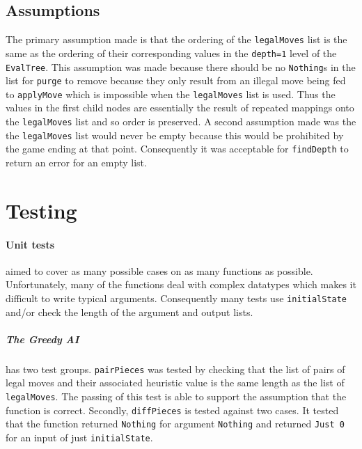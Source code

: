 \documentclass[11pt]{article}
\begin{document}
 \subsection{Assumptions}%
The primary assumption made is that the ordering of the \verb|legalMoves| list is the same as the ordering of their corresponding values in the \verb|depth=1| level of the \verb|EvalTree|. This assumption was made because there should be no \verb|Nothing|s in the list for \verb|purge| to remove because they only result from an illegal move being fed to \verb|applyMove| which is impossible when the \verb|legalMoves| list is used. Thus the values in the first child nodes are essentially the result of repeated mappings onto the \verb|legalMoves| list and so order is preserved. A second assumption made was the the \verb|legalMoves| list would never be empty because this would be prohibited by the game ending at that point. Consequently it was acceptable for \verb|findDepth| to return an error for an empty list.

\newpage
\section{Testing}%
\paragraph{Unit tests} aimed to cover as many possible cases on as many functions as possible. Unfortunately, many of the functions deal with complex datatypes which makes it difficult to write typical arguments. Consequently many tests use \verb|initialState| and/or check the length of the argument and output lists.

\subparagraph{The Greedy AI} has two test groups. \verb|pairPieces| was tested by checking that the list of pairs of legal moves and their associated heuristic value is the same length as the list of \verb|legalMoves|. The passing of this test is able to support the assumption that the function is correct. Secondly, \verb|diffPieces| is tested against two cases. It tested that the function returned \verb|Nothing| for argument \verb|Nothing| and returned \verb|Just 0| for an input of just \verb|initialState|.
\end{document}
